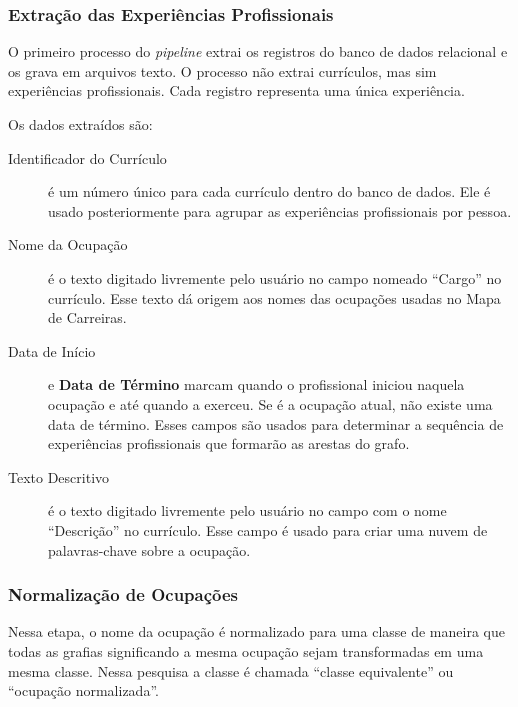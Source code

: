 \documentclass[12pt,a4paper]{article}
\begin{document}
\subsubsection{Extração das Experiências Profissionais} \label{sec:extracao-experiencia}

O primeiro processo do \textit{pipeline} extrai os registros do banco de dados relacional e os grava em arquivos texto. O processo não extrai currículos, mas sim experiências profissionais. Cada registro representa uma única experiência.

Os dados extraídos são:

\begin{description}

  \item[Identificador do Currículo] é um número único para cada currículo dentro do banco de dados. Ele é usado posteriormente para agrupar as experiências profissionais por pessoa.

  \item[Nome da Ocupação] é o texto digitado livremente pelo usuário no campo nomeado \enquote{Cargo} no currículo. Esse texto dá origem aos nomes das ocupações usadas no Mapa de Carreiras.

  \item[Data de Início] e \textbf{Data de Término} marcam quando o profissional iniciou naquela ocupação e até quando a exerceu. Se é a ocupação atual, não existe uma data de término. Esses campos são usados para determinar a sequência de experiências profissionais que formarão as arestas do grafo.

  \item[Texto Descritivo] é o texto digitado livremente pelo usuário no campo com o nome \enquote{Descrição} no currículo. Esse campo é usado para criar uma nuvem de palavras-chave sobre a ocupação.

\end{description}

\subsubsection{Normalização de Ocupações} \label{sec:normalizacao}

Nessa etapa, o nome da ocupação é normalizado para uma classe de maneira que todas as grafias significando a mesma ocupação sejam transformadas em uma mesma classe. Nessa pesquisa a classe é chamada \enquote{classe equivalente} ou \enquote{ocupação normalizada}.
\end{document}
